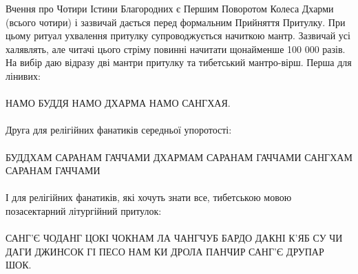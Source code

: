 Вчення про Чотири Істини Благородних є Першим Поворотом
Колеса Дхарми (всього чотири) і зазвичай дається перед формальним
Прийняття Притулку. При цьому ритуал ухвалення притулку
супроводжується начиткою мантр. Зазвичай усі халявлять, але читачі
цього стріму повинні начитати щонайменше 100 000 разів. На вибір даю
відразу дві мантри притулку та тибетський мантро-вірш.
\newpage
Перша для лінивих:
\\
\\
НАМО БУДДЯ НАМО ДХАРМА НАМО САНГХАЯ.
\\
\\
Друга для релігійних фанатиків середньої упоротості:
\\
\\
БУДДХАМ САРАНАМ ГАЧЧАМИ ДХАРМАМ САРАНАМ ГАЧЧАМИ САНГХАМ САРАНАМ ГАЧЧАМИ
\\
\\
І для релігійних фанатиків, які хочуть знати все,
тибетською мовою позасектарний літургійний притулок:
\\
\\
САНГ'Є ЧОДАНГ ЦОКІ ЧОКНАМ ЛА ЧАНГЧУБ БАРДО ДАКНІ
К'ЯБ СУ ЧИ ДАГИ ДЖИНСОК ГІ ПЕСО НАМ КИ ДРОЛА ПАНЧИР
САНГ'Є ДРУПАР ШОК.